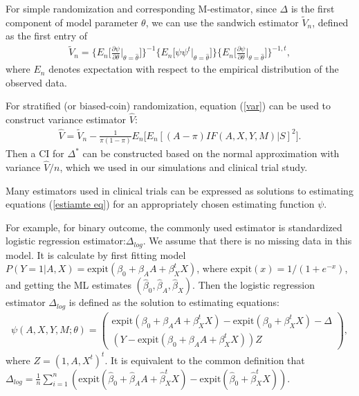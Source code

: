 \documentclass{article}
\begin{document}
For simple randomization and corresponding M-estimator, since $\Delta$ is the first component of model parameter $\theta$, we can use the sandwich estimator $\widetilde{V}_n$, defined as the first entry of
\begin{align}
    \widetilde{V}_n=\Big\{E_n\big[\frac{\partial \psi}{\partial \theta}\Big|_{\theta=\hat{\theta}}\big]\Big\}^{-1} \Big\{E_n\big[\psi \psi^{t}\Big|_{\theta=\hat{\theta}}\big]\Big\}
    \Big\{E_n\big[\frac{\partial \psi}{\partial \theta}\Big|_{\theta=\hat{\theta}}\big]\Big\}^{-1,t},\nonumber
\end{align}
where $E_n$ denotes expectation with respect to the empirical distribution of the observed data.

For stratified (or biased-coin) randomization, equation (\ref{var}) can be used to construct variance estimator $\hat{V}$:
\begin{align}
    \hat{V}=\widetilde{V}_n-\frac{1}{\pi(1-\pi)}E_n\big[E_n[(A-\pi)IF(A,X,Y,M)|S]^2\big].\nonumber
\end{align}
Then a CI for $\Delta^*$ can be constructed based on the normal approximation with variance $\hat{V}/n$, which we used in our simulations and clinical trial study.

Many estimators used in
clinical trials can be expressed as solutions to estimating equations (\ref{estiamte eq}) for an appropriately chosen estimating function $\psi$. 
 
For example, for binary outcome, the commonly used estimator is standardized logistic regression estimator:$\Delta_{log}$. We assume that there is no missing data in this model.
It is calculate by first fitting model $P(Y=1|A,X)= \mathrm{expit}(\beta_0+\beta_A A+\beta_{X}^{t}X)$, where $\mathrm{expit}(x)=1/(1+e^{-x})$, and getting the ML estimates $(\hat{\beta}_0,\hat{\beta}_A,\hat{\beta}_X)$.
Then the logistic regression estimator $\Delta_{log}$ is defined as the solution to estimating equations:
\begin{align}
    \psi(A,X,Y,M;\theta) = \left(
    \begin{array}{c}
    \mathrm{expit}(\beta_0+\beta_A A+\beta_{X}^{t}X)-\mathrm{expit}(\beta_0+\beta_{X}^{t}X)-\Delta        \\
    (Y-\mathrm{expit}(\beta_0+\beta_A A+\beta_{X}^{t}X))Z     
    \end{array}
    \right),\nonumber
\end{align}
where $Z=(1,A,X^{t})^{t}$. It is equivalent to the common definition that $\Delta_{log} = \frac{1}{n}\sum_{i=1}^n (\mathrm{expit}(\hat{\beta}_0+\hat{\beta}_A A+\hat{\beta}_{X}^{t}X)-\mathrm{expit}(\hat{\beta}_0+\hat{\beta}_{X}^{t}X))$.
 
\end{document}
